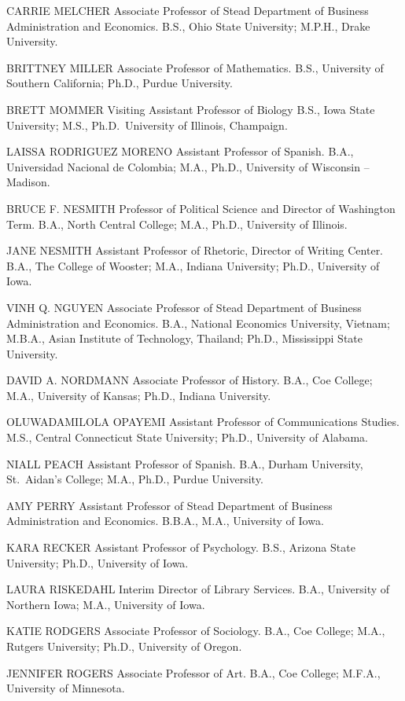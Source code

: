 \documentclass[
  letterpaper,
]{scrbook}
\begin{document}
CARRIE MELCHER Associate Professor of Stead Department of Business
Administration and Economics. B.S., Ohio State University; M.P.H., Drake
University.

BRITTNEY MILLER Associate Professor of Mathematics. B.S., University of
Southern California; Ph.D., Purdue University.

BRETT MOMMER Visiting Assistant Professor of Biology B.S., Iowa State
University; M.S., Ph.D.~University of Illinois, Champaign.

LAISSA RODRIGUEZ MORENO Assistant Professor of Spanish. B.A.,
Universidad Nacional de Colombia; M.A., Ph.D., University of Wisconsin
-- Madison.

BRUCE F. NESMITH Professor of Political Science and Director of
Washington Term. B.A., North Central College; M.A., Ph.D., University of
Illinois.

JANE NESMITH Assistant Professor of Rhetoric, Director of Writing
Center. B.A., The College of Wooster; M.A., Indiana University; Ph.D.,
University of Iowa.

VINH Q. NGUYEN Associate Professor of Stead Department of Business
Administration and Economics. B.A., National Economics University,
Vietnam; M.B.A., Asian Institute of Technology, Thailand; Ph.D.,
Mississippi State University.

DAVID A. NORDMANN Associate Professor of History. B.A., Coe College;
M.A., University of Kansas; Ph.D., Indiana University.

OLUWADAMILOLA OPAYEMI Assistant Professor of Communications Studies.
M.S., Central Connecticut State University; Ph.D., University of
Alabama.

NIALL PEACH Assistant Professor of Spanish. B.A., Durham University,
St.~Aidan's College; M.A., Ph.D., Purdue University.

AMY PERRY Assistant Professor of Stead Department of Business
Administration and Economics. B.B.A., M.A., University of Iowa.

KARA RECKER Assistant Professor of Psychology. B.S., Arizona State
University; Ph.D., University of Iowa.

LAURA RISKEDAHL Interim Director of Library Services. B.A., University
of Northern Iowa; M.A., University of Iowa.

KATIE RODGERS Associate Professor of Sociology. B.A., Coe College; M.A.,
Rutgers University; Ph.D., University of Oregon.

JENNIFER ROGERS Associate Professor of Art. B.A., Coe College; M.F.A.,
University of Minnesota.
\end{document}
